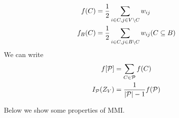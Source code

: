 \documentclass{article}
\begin{document}
\begin{align}
f(C) & = {1\over 2}\sum_{i\in C, j \in V\backslash C} w_{ij} \\
f_B(C) & = {1\over 2}\sum_{i\in C, j \in B\backslash C} w_{ij} (C \subseteq B) \\
\end{align}
We can write 
\begin{align}
f[\mathcal{P}] & = \sum_{C \in \mathcal{P}} f(C) \\
I_{\mathcal{P}}(Z_V)  &= { 1 \over \lvert\mathcal{P}\rvert  - 1}f(\mathcal{P}) 
\end{align}

Below we show some properties of MMI.





\end{document}
